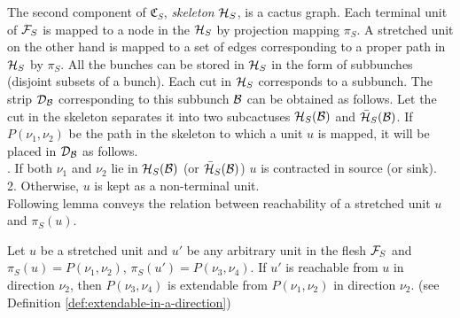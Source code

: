 The second component of ${\mathfrak C}_S$, {\em skeleton} ${\cal H}_S$, is a cactus graph. 
Each terminal unit of ${\cal F}_S$ is mapped to a node in the ${\cal H}_S$ by projection mapping ${\pi}_S$. A stretched unit on the other hand is mapped to a set of edges corresponding to a proper path in ${\cal H}_S$ by ${\pi}_S$. 
All the bunches can be stored in ${\cal H}_S$ in the form of subbunches (disjoint subsets of a bunch). Each cut in ${\cal H}_S$ corresponds to a subbunch. The strip ${\cal D}_{\cal B}$ corresponding to this subbunch $\cal B$ can be obtained as follows. Let the cut in the skeleton separates it into two subcactuses ${\cal H}_S(\cal B)$ and ${\bar {\cal H}_S(\cal B)}$. If $P(\nu_1,\nu_2)$ be the path in the skeleton to which a unit $u$ is mapped, it will be placed in ${\cal D}_{\cal B}$ as follows.\\

. If both $\nu_1$ and $\nu_2$ lie in ${\cal H}_S(\cal B)$ (or ${\bar {\cal H}_S(\cal B)}$) $u$ is contracted in source (or sink).\\
2. Otherwise, $u$ is kept as a non-terminal unit.\\

Following lemma conveys the relation between reachability of a stretched unit $u$ and $\pi_S(u)$.

\begin{lemma}
Let $u$ be a stretched unit and $u'$ be any arbitrary unit in the flesh ${\cal F}_S$ and $\pi_S(u) = P(\nu_1,\nu_2)$, $\pi_S(u') = P(\nu_3,\nu_4)$. If $u'$ is reachable from $u$ in direction $\nu_2$, then $P(\nu_3,\nu_4)$ is extendable from $P(\nu_1,\nu_2)$ in direction $\nu_2$. (see Definition \ref{def:extendable-in-a-direction})
\label{lem:path-extendable}
\end{lemma}

